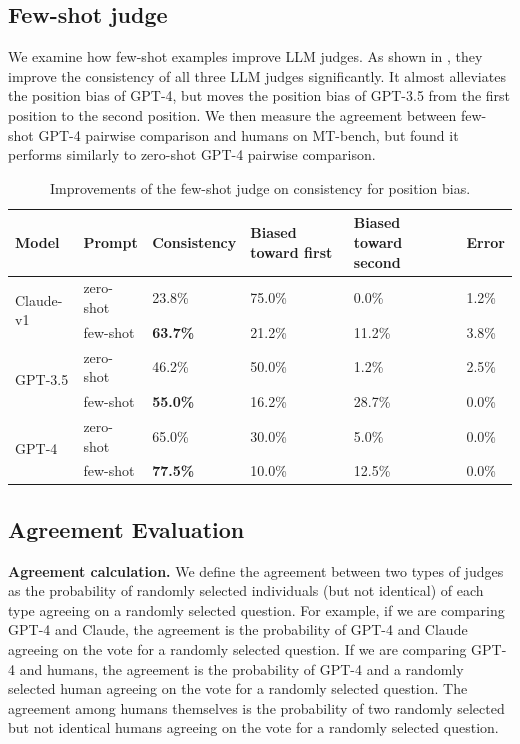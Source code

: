 \subsection{Few-shot judge}
\label{subsec:additional-few-shot-judge}
We examine how few-shot examples improve LLM judges. As shown in , they improve the consistency of all three LLM judges significantly. It almost alleviates the position bias of GPT-4, but moves the position bias of GPT-3.5 from the first position to the second position. We then measure the agreement between few-shot GPT-4 pairwise comparison and humans on MT-bench, but found it performs similarly to zero-shot GPT-4 pairwise comparison.

\begin{table}[h]
\centering
\footnotesize
\caption{Improvements of the few-shot judge on consistency for position bias.}
\label{tab:few_shot_judge_consistency}

\begin{tabular}{@{}llllll@{}}
\toprule
Model & Prompt  & Consistency & Biased toward first & Biased toward second & Error \\
\midrule
\multirow{2}{*}{Claude-v1} & zero-shot & 23.8\% & 75.0\% & 0.0\% & 1.2\% \\
 & few-shot & \textbf{63.7\%} & 21.2\% & 11.2\% & 3.8\% \\
\midrule
\multirow{2}{*}{GPT-3.5} & zero-shot & 46.2\% & 50.0\% & 1.2\% & 2.5\% \\
 & few-shot & \textbf{55.0\%} & 16.2\% & 28.7\% & 0.0\% \\
\midrule
\multirow{2}{*}{GPT-4} & zero-shot & 65.0\% & 30.0\% & 5.0\% & 0.0\% \\
 & few-shot & \textbf{77.5\%} & 10.0\% & 12.5\% & 0.0\% \\
\bottomrule
\end{tabular}
\end{table}

\subsection{Agreement Evaluation}
\label{subsec:agreement-evaluation}

\textbf{Agreement calculation.}
We define the agreement between two types of judges as the probability of randomly selected individuals (but not identical) of each type agreeing on a randomly selected question.
For example, if we are comparing GPT-4 and Claude, the agreement is the probability of GPT-4 and Claude agreeing on the vote for a randomly selected question.
If we are comparing GPT-4 and humans, the agreement is the probability of GPT-4 and a randomly selected human agreeing on the vote for a randomly selected question.
The agreement among humans themselves is the probability of two randomly selected but not identical humans agreeing on the vote for a randomly selected question.

